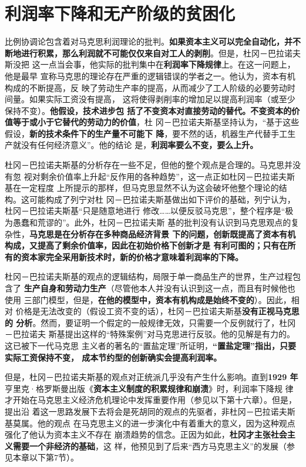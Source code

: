 \section{利润率下降和无产阶级的贫困化}

比例协调论包含着对马克思利润理论的批判。\textbf{如果资本主义可以完全自动化，并不
  断地进行积累，那么利润就不可能仅仅来自对工人的剥削}。但是，杜冈－巴拉诺夫斯没把
这一点当会事，他实际的批判集中在\textbf{利润率下降规律}上。在这一问题上，他是最早
宣称马克思的理论存在严重的逻辑错误的学者之一。他认为，资本有机构成的不断提高，反
映了劳动生产率的提高，从而减少了工人阶级的必要劳动时间量。如果实际工资没有提高，
这将使得剥削率的增加足以提高利润率（或至少保持不变）。\textbf{他假设，技术进步包
  括了不变资本对直接劳动的替代。不变资本的价值等于或小于它替代的劳动力的价值}，杜
冈－巴拉诺夫斯基坚持认为，“基于这些假设，\textbf{新的技术条件下的生产量不可能下
  降}，要不然的话，机器生产代替手工生产就没有任何经济意义”。他的结论
是，\textbf{利润率要么不变，要么上升。}

杜冈－巴拉诺夫斯基的分析存在一些不足，但他的整个观点是合理的。马克思并没有忽
视对剩余价值率上升起“反作用的各种趋势”，这一点正如杜冈－巴拉诺夫斯基在一定程度
上所提示的那样，但马克思显然不认为这会破坏他整个理论的结构。这可能构成了列宁对杜
冈－巴拉诺夫斯基做出如下评价的基础，列宁认为，杜冈－巴拉诺夫斯基“只是随意地进行
修改……以便反驳马克思”，整个程序是“极为愚蠢和荒谬的”。此外，杜冈－巴拉诺夫斯
基的批判没有认识到马克思观点的复杂性，\textbf{马克思是在分析存在多种商品经济背景
下的问题，创新既提高了资本有机构成，又提高了剩余价值率，因此在初始价格下创新才是
有利可图的；只有在所有的资本家完全采用新技术时，新的价格才意味着利润率的下降。}

杜冈－巴拉诺夫斯基的观点的逻辑结构，局限于单一商品生产的世界，生产过程包含了
\textbf{生产自身和劳动力生产}（尽管他本人并没有认识到这一点，而且有时候他也使用
三部门模型，但是，\textbf{在他的模型中，资本有机构成是始终不变的}）。因此，相对
价格是无法改变的（假设工资不变的话），杜冈－巴拉诺夫斯基\textbf{没有正视马克思的
分析}。然而，要证明一个假定的一般规律无效，只需要一个反例就行了，杜冈－巴拉诺夫
斯基提出这样的“特殊案例”对马克思进行反驳。他的见解是有力的。这已被下一代马克思
主义者的著名的“置盐定理”所证明，\textbf{“置盐定理”指出，只要实际工资保持不变，
成本节约型的创新确实会提高利润率。}

但是，杜冈－巴拉诺夫斯基的观点对正统派几乎没有产生什么影响。直到\textbf{1929
年}亨里克·格罗斯曼出版《\textbf{资本主义制度的积累规律和崩溃}》时，利润率下降规
律才开始在马克思主义经济危机理论中发挥重要作用（参见以下第十六章）。但是，提出沿
着这一思路发展下去将会是死胡同的观点的先驱者，非杜冈－巴拉诺夫斯基莫属。他的观点
在马克思主义的进一步演化中有着重大的意义，因为这种观点强化了他认为资本主义不存在
崩溃趋势的信念。正因为如此，\textbf{杜冈才主张社会主义需要一个非经济的基础}，这
样，他预见到了后来“西方马克思主义”的发展（参见本章以下第7节）。

